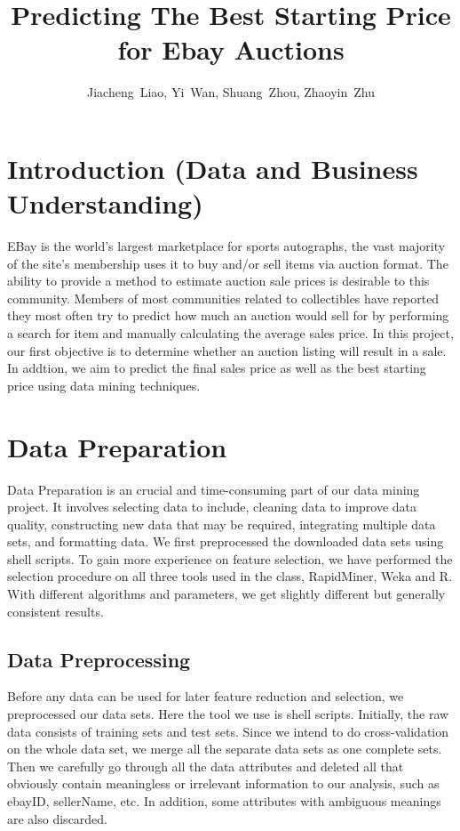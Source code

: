 \documentclass[CEJM,PDF]{cej} %
\title{Predicting The Best Starting Price for Ebay Auctions}
\author{Jiacheng~Liao\inst{1},
        Yi~Wan\inst{1},
        Shuang~Zhou\inst{1},
        Zhaoyin~Zhu\inst{2}
       }
\institute{\inst{1}
           Department of Computer Science, New York University, New York, NY 10012, USA
           \inst{2}
           Division of Biostatistics, NYU School of Medicine, New York, NY 10016, USA
          }
\begin{document}
\maketitle
\section{Introduction (Data and Business Understanding) }

EBay is the world’s largest marketplace for sports autographs, the vast majority of the site’s membership uses it to buy and/or sell items via auction format. The ability to provide a method to estimate auction sale prices is desirable to this community. Members of most communities related to collectibles have reported they most often try to predict how much an auction would sell for by performing a search for item and manually calculating the average sales price. In this project, our first objective is to determine whether an auction listing will result in a sale. In addtion, we aim to predict the final sales price as well as the best starting price using data mining techniques.


\section{Data Preparation}

Data Preparation is an crucial and time-consuming part of our data mining project. It involves selecting data to include, cleaning data to improve data quality, constructing new data that may be required, integrating multiple data sets, and formatting data. We first preprocessed the downloaded data sets using shell scripts. To gain more experience on feature selection, we have performed the selection procedure on all three tools used in the class, RapidMiner, Weka and R. With different algorithms and parameters, we get slightly different but generally consistent results. 

\subsection*{Data Preprocessing}
Before any data can be used for later feature reduction and selection, we preprocessed our data sets. Here the tool we use is shell scripts. Initially, the raw data consists of training sets and test sets. Since we intend to do cross-validation on the whole data set, we merge all the separate data sets as one complete sets. Then we carefully go through all the data attributes and deleted all that obviously contain meaningless or irrelevant information to our analysis, such as ebayID, sellerName, etc. In addition, some attributes with ambiguous meanings are also discarded. 
\end{document}
